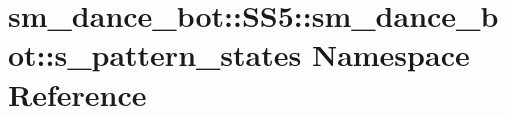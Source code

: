 \hypertarget{namespacesm__dance__bot_1_1SS5_1_1sm__dance__bot_1_1s__pattern__states}{}\section{sm\+\_\+dance\+\_\+bot\+:\+:S\+S5\+:\+:sm\+\_\+dance\+\_\+bot\+:\+:s\+\_\+pattern\+\_\+states Namespace Reference}
\label{namespacesm__dance__bot_1_1SS5_1_1sm__dance__bot_1_1s__pattern__states}
